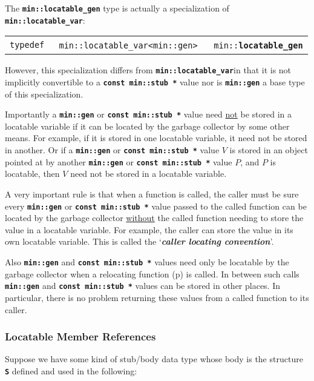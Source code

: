 \documentclass[12pt]{article}
\makeatletter
\newcommand{\TT}[1]{{\tt \bfseries #1}}
\newcommand{\key}[1]{{\bf \em #1}\index{#1}}
\newcommand{\ttindex}[1]{\index{#1@{\tt #1}}}
\newcommand{\minindex}[1]{\ttindex{min::#1}\ttindex{#1}}
\newcommand{\pagref}[1]{p\pageref{#1}}
\newcommand{\EOL}{\penalty \exhyphenpenalty}
\newenvironment{indpar}[1][0.3in]%
	{\begin{list}{}%
		     {\setlength{\itemsep}{0in}%
		      \setlength{\topsep}{0in}%
		      \setlength{\parsep}{1ex}%
		      \setlength{\labelwidth}{#1}%
		      \setlength{\leftmargin}{#1}%
		      \addtolength{\leftmargin}{\labelsep}}%
	 \item}%
	{\end{list}}
\newcommand{\LABEL}[1]{\label{#1}}
\newcommand{\MINKEY}[1]{{\tt \bf #1}\minindex{#1}}
\makeatother
\begin{document}
The \TT{min::locatable\_gen} type is actually a specialization
of \TT{min::\EOL locatable\_\EOL var}:

\begin{indpar}[0.1in]\begin{tabular}{r@{}l}
\verb|typedef |
	& \verb|min::locatable_var<min::gen>| ~~
	  \verb|min::|\MINKEY{locatable\_gen}
\LABEL{MIN::LOCATABLE_GEN_TYPEDEF} \\
\end{tabular}\end{indpar}

However, this specialization differs from
\TT{min::\EOL locatable\_\EOL var\TARG}in that it is not
implicitly convertible to a \TT{const min::\EOL stub~*} value nor
is \TT{min::gen} a base type of this specialization.

Importantly a \TT{min::gen} or \TT{const min::stub *}
value need \underline{not} be stored
in a locatable variable if it can be located by the garbage collector by some
other means.  For example, if it is stored in one locatable variable,
it need not be stored in another.  Or if a \TT{min::gen}
or \TT{const min::\EOL stub~*} value
$V$ is stored in an object pointed at by another \TT{min::gen}
or \TT{const min::\EOL stub~*}
value $P$, and $P$ is locatable, then $V$ need not
be stored in a locatable variable.

A very important rule is that when a function is called, the caller
must be sure every \TT{min::gen}
or \TT{const min::\EOL stub~*} value passed to the called
function can be located by the garbage collector \underline{without} the called
function needing to store the value in a locatable variable.
For example, the caller can store the value in its own locatable
variable.  This is called the `\key{caller locating convention}'.

Also \TT{min::gen} and \TT{const min::\EOL stub~*}
values need only be locatable by
the garbage collector when a relocating function (\pagref{RELOCATING-FUNCTIONS})
is called.  In between such calls \TT{min::gen}
and \TT{const min::\EOL stub *} values can be
stored in other places.  In particular, there is no problem
returning these values from a called function to its caller.

\subsubsection{Locatable Member References}
\label{LOCATABLE-MEMBER-REFERENCES}

Suppose we have some kind of stub/body data type whose body
is the structure \TT{S} defined and used in the following:
\end{document}
